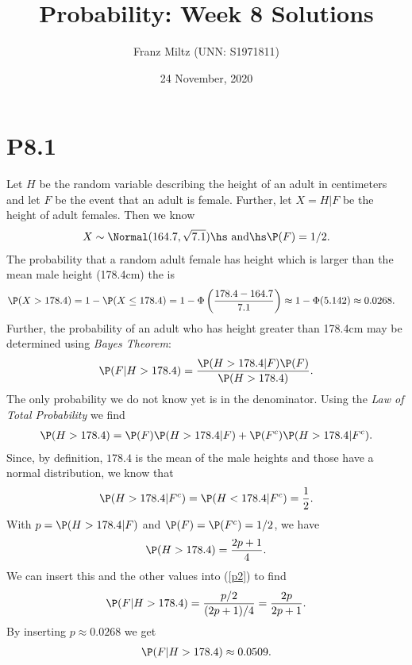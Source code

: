 \documentclass{article}
\begin{document}
\title{Probability: Week 8 Solutions}
\author{Franz Miltz (UNN: S1971811)}
\date{24 November, 2020}
\maketitle

\section*{P8.1}

Let $H$ be the random variable describing the height of an adult in centimeters
and let $F$ be the event that an adult is female. Further, let $X=H|F$ be the
height of adult females. Then we know
\begin{align*}
  X \sim \Normal(164.7, \sqrt{7.1})
  \text{\hs and\hs}
  \P(F) = 1/2.
\end{align*}
The probability that a random adult female has height which is larger than
the mean male height (178.4cm) the is
\begin{align*}
  \P(X>178.4) & = 1 - \P(X \leq 178.4) = 1 - \Phi\left(\frac{178.4-164.7}{7.1}\right)
  \approx 1-\Phi(5.142) \approx 0.0268.
\end{align*}
Further, the probability of an adult who has height greater than 178.4cm
may be determined using \emph{Bayes Theorem}:
\begin{align}
  \label{p2}
  \P(F|H>178.4) = \frac{\P(H>178.4|F)\P(F)}{\P(H>178.4)}.
\end{align}
The only probability we do not know yet is in the denominator. Using the
\emph{Law of Total Probability} we find
\begin{align*}
  \P(H>178.4) = \P(F)\P(H>178.4|F) + \P(F^c)\P(H>178.4|F^c).
\end{align*}
Since, by definition, $178.4$ is the mean of the male heights and those
have a normal distribution, we know that
\begin{align*}
  \P(H>178.4|F^c) = \P(H<178.4|F^c)=\frac{1}{2}.
\end{align*}
With $p=\P(H>178.4|F)$ and $\P(F)=\P(F^c)=1/2$, we have
\begin{align*}
  \P(H>178.4) = \frac{2p+1}{4}.
\end{align*}
We can insert this and the other values into (\ref{p2}) to find
\begin{align*}
  \P(F|H>178.4)=\frac{p/2}{(2p+1)/4}=\frac{2p}{2p+1}.
\end{align*}
By inserting $p\approx 0.0268$ we get
\begin{align*}
  \P(F|H>178.4)\approx 0.0509.
\end{align*}
\end{document}
